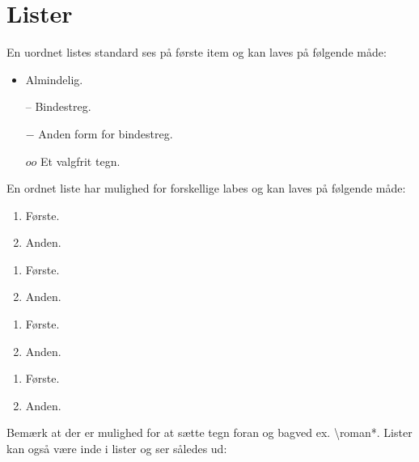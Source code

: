 \documentclass[class=report, crop=false]{standalone}
\begin{document}
    \section{Lister}
    En uordnet listes standard ses på første item og kan laves på følgende måde:
    \begin{tcblisting}{}
        \begin{itemize}
            \item Almindelig.
            \item[--] Bindestreg.
            \item[$-$] Anden form for bindestreg.
            \item[$oo$] Et valgfrit tegn. 
        \end{itemize}
    \end{tcblisting}
    \noindent En ordnet liste har mulighed for forskellige labes og kan laves på følgende måde:
    \begin{tcblisting}{}
        \begin{enumerate}
            \item Første.
            \item Anden.
        \end{enumerate}
        \begin{enumerate}[label=\arabic*)]
            \item Første.
            \item Anden.
        \end{enumerate}
        \begin{enumerate}[label=(\roman*)]
            \item Første.
            \item Anden.
        \end{enumerate}
        \begin{enumerate}[label=\alph*]
            \item Første.
            \item Anden.
        \end{enumerate}
    \end{tcblisting}
    \noindent Bemærk at der er mulighed for at sætte tegn foran og bagved ex. \textbackslash roman*. Lister kan også være inde i lister og ser således ud:
\end{document}
